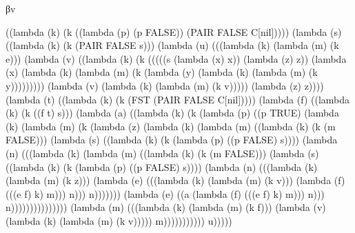 \documentclass[ms,electronic,twosidetoc,letterpaper,chaptercenter,parttop]{byumsphd}
\begin{document}
\begin{theorem}
βv
\begin{schemedisplay}
((lambda (k) (k ((lambda (p) (p FALSE))
           (PAIR FALSE C[nil]))))
 (lambda (s) ((lambda (k) (k (PAIR FALSE s)))
        (lambda (u) (((lambda (k) (lambda (m) (k e)))
                (lambda (v) ((lambda (k) (k (((((s (lambda (x) x)) (lambda (z) z))
                                   (lambda (x) (lambda (k) (lambda (m) (k (lambda (y) (lambda (k) (lambda (m) (k y)))))))))
                                  (lambda (v) (lambda (k) (lambda (m) (k v))))) (lambda (z) z))))
                       (lambda (t) ((lambda (k) (k (FST
                                        (PAIR FALSE C[nil]))))
                              (lambda (f) ((lambda (k) (k ((f t) s)))
                                     (lambda (a) ((lambda (k) (k (lambda (p) ((p TRUE)
                                                            (lambda (k) (lambda (m) (k (lambda (z) (lambda (k) (lambda (m) ((lambda (k) (k (m FALSE)))
                                                                                              (lambda (s) ((lambda (k) (k (lambda (p) ((p FALSE) s))))
                                                                                                     (lambda (n) (((lambda (k) (lambda (m) ((lambda (k) (k (m FALSE)))
                                                                                                                          (lambda (s) ((lambda (k) (k (lambda (p) ((p FALSE) s))))
                                                                                                                                 (lambda (n) (((lambda (k) (lambda (m) (k z)))
                                                                                                                                         (lambda (e) (((lambda (k) (lambda (m) (k v)))
                                                                                                                                                 (lambda (f) (((e f) k) m))) n))) n)))))))
                                                                                                             (lambda (e) ((a (lambda (f) (((e f) k) m))) n))) n)))))))))))))))
                                            (lambda (m) (((lambda (k) (lambda (m) (k f)))
                                                    (lambda (v) (lambda (k) (lambda (m) (k v))))) m))))))))))) u)))))
\end{schemedisplay}


\end{theorem}
\end{document}
